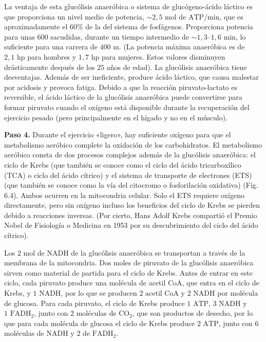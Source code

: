 \documentclass[12pt]{book}
\begin{document}
La ventaja de esta glucólisis anaeróbica o sistema de glucógeno-ácido láctico es que proporciona un nivel medio de potencia, $\sim 2,5\text{ mol de ATP/min}$, que es aproximadamente el $60\%$ de la del sistema de fosfágenos. Proporciona potencia para unas $600$ sacudidas, durante un tiempo intermedio de $\sim 1,3\text{--}1,6\text{ min}$, lo suficiente para una carrera de $400\text{ m}$. (La potencia máxima anaeróbica es de $2,1\text{ hp}$ para hombres y $1,7\text{ hp}$ para mujeres. Estos valores disminuyen drásticamente después de los $25$ años de edad). La glucólisis anaeróbica tiene desventajas. Además de ser ineficiente, produce ácido láctico, que causa malestar por acidosis y provoca fatiga. Debido a que la reacción piruvato-lactato es reversible, el ácido láctico de la glucólisis anaeróbica puede convertirse para formar piruvato cuando el oxígeno está disponible durante la recuperación del ejercicio pesado (pero principalmente en el hígado y no en el músculo).

\textbf{Paso 4.} Durante el ejercicio «ligero», hay suficiente oxígeno para que el metabolismo aeróbico complete la oxidación de los carbohidratos. El metabolismo aeróbico consta de dos procesos complejos además de la glucólisis anaeróbica: el ciclo de Krebs (que también se conoce como el ciclo del ácido tricarboxílico (TCA) o ciclo del ácido cítrico) y el sistema de transporte de electrones (ETS) (que también se conoce como la vía del citocromo o fosforilación oxidativa) (Fig. 6.4). Ambos ocurren en la mitocondria celular. Solo el ETS requiere oxígeno directamente, pero sin oxígeno incluso los beneficios del ciclo de Krebs se pierden debido a reacciones inversas. (Por cierto, Hans Adolf Krebs compartió el Premio Nobel de Fisiología o Medicina en 1953 por su descubrimiento del ciclo del ácido cítrico).

Los $2\text{ mol}$ de NADH de la glucólisis anaeróbica se transportan a través de la membrana de la mitocondria. Dos moles de piruvato de la glucólisis anaeróbica sirven como material de partida para el ciclo de Krebs. Antes de entrar en este ciclo, cada piruvato produce una molécula de acetil CoA, que entra en el ciclo de Krebs, y $1\text{ NADH}$, por lo que se producen $2\text{ acetil CoA}$ y $2\text{ NADH}$ por molécula de glucosa. Para cada piruvato, el ciclo de Krebs produce $1\text{ ATP}$, $3\text{ NADH}$ y $1\text{ FADH}_2$, junto con $2$ moléculas de $\text{CO}_2$, que son productos de desecho, por lo que para cada molécula de glucosa el ciclo de Krebs produce $2\text{ ATP}$, junto con $6$ moléculas de NADH y $2$ de $\text{FADH}_2$.
\end{document}
